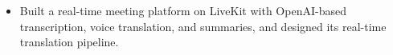 \projMeetQ
\begin{itemize}
    \item Built a real-time meeting platform on LiveKit with OpenAI-based transcription, voice translation, and summaries, and designed its real-time translation pipeline. %
\end{itemize}

\cveducation


